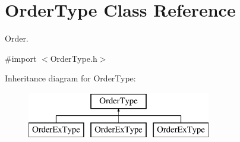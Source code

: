 \hypertarget{interface_order_type}{
\section{OrderType Class Reference}
\label{interface_order_type}
}


Order.  




{\ttfamily \#import $<$OrderType.h$>$}

Inheritance diagram for OrderType:\begin{figure}[H]
\begin{center}
\leavevmode
\includegraphics[height=2.000000cm]{interface_order_type}
\end{center}
\end{figure}
